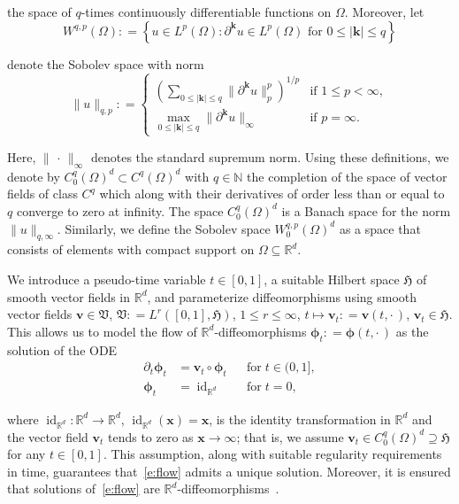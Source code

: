 \documentclass[11pt]{amsart}
\newcommand\fs[1]{\ensuremath{\mathfrak{#1}}}
\newcommand{\defeq}{\ensuremath{\mathrel{\mathop:}=}}
\renewcommand{\vec}[1]{\ensuremath{\boldsymbol{#1}}}
\begin{document}
\noindent the space of $q$-times continuously differentiable functions on $\Omega$. Moreover, let
\[
W^{q,p}(\Omega)
\defeq
\left\{
u \in L^p(\Omega) : \partial^{\vec{k}} u \in L^p(\Omega) \text{ for } 0 \leq |\vec{k}| \leq q
\right\}
\]

\noindent denote the Sobolev space with norm
\begin{equation}\label{e:sobolevnorm}
\|u\|_{q,p}
\defeq
\begin{cases}
\left(\sum_{0 \leq |\vec{k}| \leq q} \|\partial^{\vec{k}} u\|^p_p\right)^{1/p}  &\text{if } 1 \leq p < \infty,\\
\max_{0 \leq |\vec{k}| \leq q} \|\partial^{\vec{k}} u \|_{\infty} &\text{if } p = \infty.
\end{cases}
\end{equation}

\noindent Here, $\|\,\cdot\,\|_{\infty}$ denotes the standard supremum norm. Using these definitions, we denote by $C^q_0(\Omega)^d \subset C^q(\Omega)^d$ with $q \in \mathbb{N}$ the completion of the space of vector fields of class $C^q$ which along with their derivatives of order less than or equal to $q$ converge to zero at infinity. The space $C^q_0(\Omega)^d$ is a Banach space for the norm $\|u \|_{q,\infty}$. Similarly, we define the Sobolev space $W^{q,p}_0(\Omega)^d$ as a space that consists of elements with compact support on $\Omega \subseteq \mathbb{R}^d$.

We introduce a pseudo-time variable $t \in [0,1]$, a suitable Hilbert space $\fs{H}$ of smooth vector fields in $\mathbb{R}^d$, and parameterize diffeomorphisms using smooth vector fields $\vec{v} \in \fs{V}$, $\fs{V} \defeq L^r([0,1],\fs{H})$, $1 \leq r \leq \infty$, $t \mapsto \vec{v}_t \defeq \vec{v}(t,\cdot\,)$, $\vec{v}_t \in \fs{H}$. This allows us to model the flow of $\mathbb{R}^d$-diffeomorphisms $\vec{\phi}_t \defeq \vec{\phi}(t, \cdot\,)$ as the solution of the ODE
\begin{equation}\label{e:flow}
\begin{aligned}
\partial_t \vec{\phi}_t &= \vec{v}_t \circ \vec{\phi}_t && \text{for}\; t\in (0,1],\\
\vec{\phi}_t & = \operatorname{id}_{\mathbb{R}^d} && \text{for}\; t = 0,
\end{aligned}
\end{equation}

\noindent where $\operatorname{id}_{\mathbb{R}^d} : \mathbb{R}^d \to \mathbb{R}^d$, $\operatorname{id}_{\mathbb{R}^d}(\vec{x}) = \vec{x}$, is the identity transformation in $\mathbb{R}^d$ and the vector field $\vec{v}_t$ tends to zero as $\vec{x} \to \infty$; that is, we assume $\vec{v}_t \in C^q_0(\Omega)^d \supseteq \fs{H}$ for any $t \in [0,1]$. This assumption, along with suitable regularity requirements in time, guarantees that~\eqref{e:flow} admits a unique solution. Moreover, it is ensured that solutions of~\eqref{e:flow} are $\mathbb{R}^d$-diffeomorphisms~\cite{Younes:2019a}.
\end{document}
